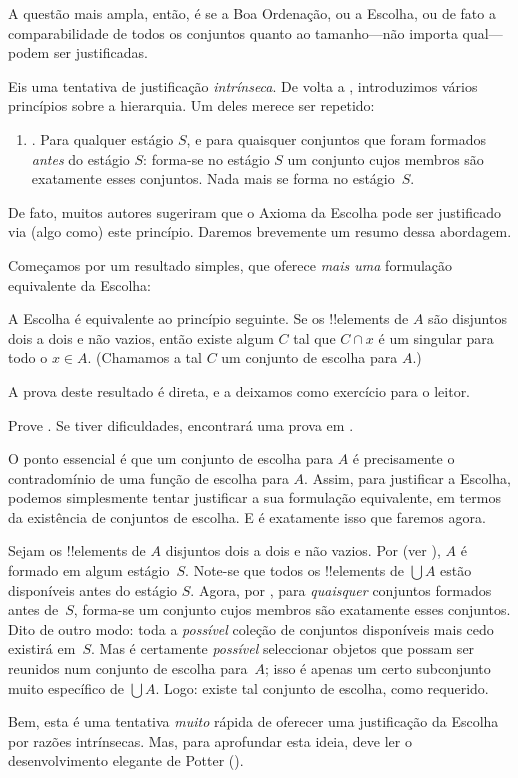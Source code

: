 \documentclass[../../../include/open-logic-section]{subfiles}
\begin{document}

A questão mais ampla, então, é se a Boa Ordenação, ou a Escolha, ou
de fato a comparabilidade de todos os conjuntos quanto ao tamanho---não
importa qual---podem ser justificadas. 

Eis uma tentativa de justificação \emph{intrínseca}. De volta a
, introduzimos vários princípios
sobre a hierarquia. Um deles merece ser repetido:
\begin{enumerate}
	\item[] \stagesacc. Para qualquer estágio $S$, e para quaisquer conjuntos que foram
	formados \emph{antes} do estágio $S$: forma-se no estágio $S$ um conjunto cujos
	membros são exatamente esses conjuntos. Nada mais se forma no
	estágio~$S$. 
\end{enumerate}
De fato, muitos autores sugeriram que o Axioma da Escolha pode ser
justificado via (algo como) este princípio. Daremos brevemente um
resumo dessa abordagem.

Começamos por um resultado simples, que oferece \emph{mais uma}
formulação equivalente da Escolha:

\begin{thm}[em $\ZF$]
A Escolha é equivalente ao princípio seguinte. Se os !!{element}s
de $A$ são disjuntos dois a dois e não vazios, então existe algum $C$ tal que $C
\cap x$ é um singular para todo o $x \in A$. (Chamamos a tal $C$ um
{conjunto de escolha} para $A$.)
\end{thm}

A prova deste resultado é direta, e a deixamos como
exercício para o leitor. 

\begin{prob}
Prove . Se tiver dificuldades,
encontrará uma prova em \cite[pp.~242--3]{Potter2004}.
\end{prob}

O ponto essencial é que um conjunto de escolha para $A$ é precisamente o contradomínio de
uma função de escolha para $A$. Assim, para justificar a Escolha, podemos simplesmente tentar
justificar a sua formulação equivalente, em termos da existência de
conjuntos de escolha. E é exatamente isso que faremos agora. 

Sejam os !!{element}s de $A$ disjuntos dois a dois e não vazios. Por \stageshier{}
(ver ), $A$ é formado em algum estágio~$S$. Note-se
que todos os !!{element}s de $\bigcup A$ estão disponíveis antes do estágio
$S$. Agora, por \stagesacc{}, para \emph{quaisquer} conjuntos formados
antes de~$S$, forma-se um conjunto cujos membros são exatamente esses conjuntos.
Dito de outro modo: toda a \emph{possível} coleção de conjuntos disponíveis mais cedo
existirá em~$S$. Mas é certamente \emph{possível} seleccionar
objetos que possam ser reunidos num conjunto de escolha para~$A$; isso é apenas
um certo subconjunto muito específico de $\bigcup A$. Logo: existe tal conjunto de escolha,
como requerido.

Bem, esta é uma tentativa \emph{muito} rápida de oferecer uma justificação da
Escolha por razões intrínsecas. Mas, para aprofundar esta ideia, deve ler
o desenvolvimento elegante de Potter (\citeyear[\S14.8]{Potter2004}).
\end{document}
